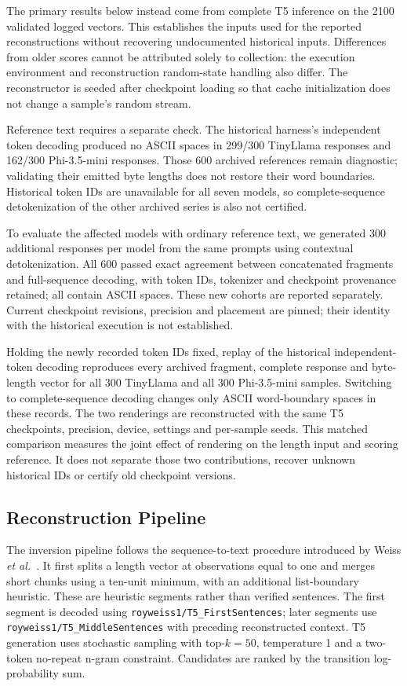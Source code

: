 \documentclass[electronics,article,submit,pdftex,moreauthors]{Definitions/mdpi}
\begin{document}
The primary results below instead come from complete T5 inference on the 2100 validated logged vectors. This establishes the inputs used for the reported reconstructions without recovering undocumented historical inputs. Differences from older scores cannot be attributed solely to collection: the execution environment and reconstruction random-state handling also differ. The reconstructor is seeded after checkpoint loading so that cache initialization does not change a sample's random stream.

Reference text requires a separate check. The historical harness's independent token decoding produced no ASCII spaces in 299/300 TinyLlama responses and 162/300 Phi-3.5-mini responses. Those 600 archived references remain diagnostic; validating their emitted byte lengths does not restore their word boundaries. Historical token IDs are unavailable for all seven models, so complete-sequence detokenization of the other archived series is also not certified.

To evaluate the affected models with ordinary reference text, we generated 300 additional responses per model from the same prompts using contextual detokenization. All 600 passed exact agreement between concatenated fragments and full-sequence decoding, with token IDs, tokenizer and checkpoint provenance retained; all contain ASCII spaces. These new cohorts are reported separately. Current checkpoint revisions, precision and placement are pinned; their identity with the historical execution is not established.

Holding the newly recorded token IDs fixed, replay of the historical independent-token decoding reproduces every archived fragment, complete response and byte-length vector for all 300 TinyLlama and all 300 Phi-3.5-mini samples. Switching to complete-sequence decoding changes only ASCII word-boundary spaces in these records. The two renderings are reconstructed with the same T5 checkpoints, precision, device, settings and per-sample seeds. This matched comparison measures the joint effect of rendering on the length input and scoring reference. It does not separate those two contributions, recover unknown historical IDs or certify old checkpoint versions.

\subsection{Reconstruction Pipeline}
The inversion pipeline follows the sequence-to-text procedure introduced by Weiss \emph{et al.}~\cite{weiss2024prompt}. It first splits a length vector at observations equal to one and merges short chunks using a ten-unit minimum, with an additional list-boundary heuristic. These are heuristic segments rather than verified sentences. The first segment is decoded using \texttt{royweiss1/T5\_FirstSentences}; later segments use \texttt{royweiss1/T5\_MiddleSentences} with preceding reconstructed context. T5 generation uses stochastic sampling with top-$k=50$, temperature 1 and a two-token no-repeat n-gram constraint. Candidates are ranked by the transition log-probability sum.
\end{document}
